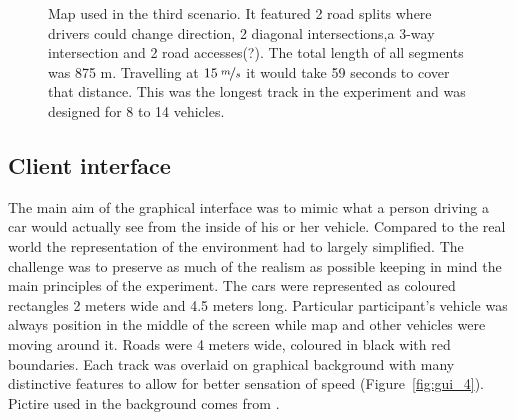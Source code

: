 \documentclass[11pt,english,twoside]{article}
\begin{document}
\begin{figure}[!] %
\caption{Map used in the third scenario. It featured 2 road splits where drivers could change direction, 2 diagonal intersections,a 3-way intersection and 2 road accesses(?). The total length of all segments was 875 m. Travelling at $15\:\nicefrac{m}{s}$ it would take 59 seconds to cover that distance. This was the longest track in the experiment and was designed for 8 to 14 vehicles.}
\label{fig:map_3_arrows}
\end{figure}



\subsection{Client interface}

The main aim of the graphical interface was to mimic what a person driving a car would actually see from the inside of his or her vehicle. Compared to the real world the representation of the environment had to largely simplified. The challenge was to preserve as much of the realism as possible keeping in mind the main principles of the experiment. The cars were represented as coloured rectangles 2 meters wide and 4.5 meters long. Particular participant's vehicle was always position in the middle of the screen while map and other vehicles were moving around it. Roads were 4 meters wide, coloured in black with red boundaries. Each track was overlaid on graphical background with many distinctive features to allow for better sensation of speed (Figure~\ref{fig:gui_4}). Pictire used in the background comes from \citet{sheerwood}.
\end{document}

